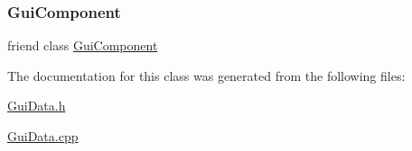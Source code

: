 \subsubsection{\texorpdfstring{GuiComponent}{GuiComponent}}
{\footnotesize\ttfamily friend class \mbox{\hyperlink{class_gui_component}{Gui\+Component}}\hspace{0.3cm}{\ttfamily [friend]}}



The documentation for this class was generated from the following files\+:\begin{DoxyCompactItemize}
\item 
\mbox{\hyperlink{_gui_data_8h}{Gui\+Data.\+h}}\item 
\mbox{\hyperlink{_gui_data_8cpp}{Gui\+Data.\+cpp}}\end{DoxyCompactItemize}
